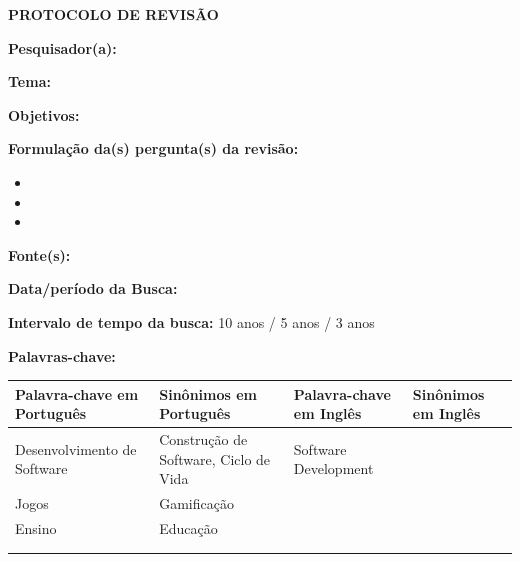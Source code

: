 \documentclass[12pt,a4paper]{article}
\begin{document}
\begin{center}
    {\Large \textbf{PROTOCOLO DE REVISÃO}}
\end{center}
\vspace{1cm}

\noindent \textbf{Pesquisador(a):} \hrulefill

\vspace{0.5cm}
\noindent \textbf{Tema:} \hrulefill

\vspace{0.5cm}
\noindent \textbf{Objetivos:} \hrulefill

\vspace{0.5cm}
\noindent \textbf{Formulação da(s) pergunta(s) da revisão:}
\begin{itemize}[label={--}, nosep]
    \item \hrulefill
    \item \hrulefill
    \item \hrulefill
\end{itemize}

\vspace{0.5cm}
\noindent \textbf{Fonte(s):} \hrulefill

\vspace{0.5cm}
\noindent \textbf{Data/período da Busca:} \hrulefill

\vspace{0.5cm}
\noindent \textbf{Intervalo de tempo da busca:} 10 anos / 5 anos / 3 anos

\vspace{0.5cm}
\noindent \textbf{Palavras-chave:}
\vspace{0.3cm}

\begin{table}[h]
\centering
\begin{tabular}{|p{4cm}|p{4cm}|p{4cm}|p{4cm}|}
\hline
\textbf{Palavra-chave em Português} & \textbf{Sinônimos em Português} & \textbf{Palavra-chave em Inglês} & \textbf{Sinônimos em Inglês} \\
\hline
Desenvolvimento de Software & Construção de Software, Ciclo de Vida & Software Development & \\
\hline
Jogos & Gamificação & & \\
\hline
Ensino & Educação & & \\
\hline
& & & \\
\hline
& & & \\
\hline
\end{tabular}
\end{table}
\end{document}
